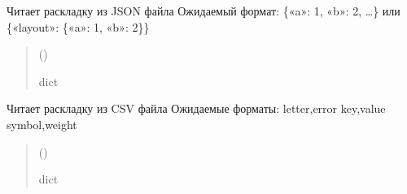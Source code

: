 \documentclass[a4paper,11pt,russian,openany,oneside]{sphinxmanual}
\begin{document}

\begin{savenotes}\begin{fulllineitems}
\label{\detokenize{scan_module:scan_module.read_layout._read_json_layout}}
\pysigstartsignatures
\pysiglinewithargsret
{}
{}
{}
\pysigstopsignatures
\sphinxAtStartPar
Читает раскладку из JSON файла
Ожидаемый формат: \{«a»: 1, «b»: 2, …\} или \{«layout»: \{«a»: 1, «b»: 2\}\}
\begin{quote}\begin{description}
\sphinxAtStartPar
{} ()

\sphinxAtStartPar
dict

\end{description}\end{quote}

\end{fulllineitems}\end{savenotes}


\begin{savenotes}\begin{fulllineitems}
\label{\detokenize{scan_module:scan_module.read_layout._read_csv_layout}}
\pysigstartsignatures
\pysiglinewithargsret
{}
{}
{}
\pysigstopsignatures
\sphinxAtStartPar
Читает раскладку из CSV файла
Ожидаемые форматы:
\sphinxhyphen{} letter,error
\sphinxhyphen{} key,value
\sphinxhyphen{} symbol,weight
\begin{quote}\begin{description}
\sphinxAtStartPar
{} ()

\sphinxAtStartPar
dict

\end{description}\end{quote}

\end{fulllineitems}\end{savenotes}
\end{document}
